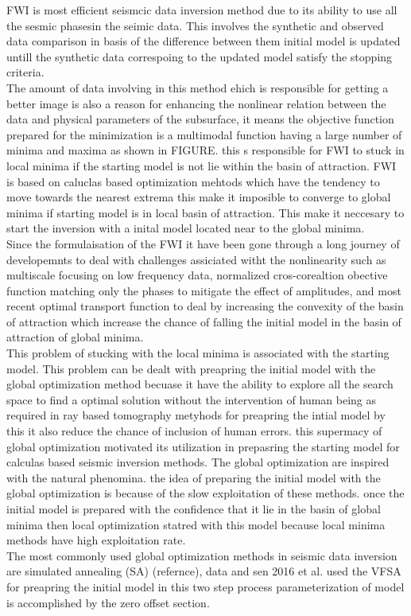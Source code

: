 \documentclass[paper,revised]{geophysics}
\begin{document}
FWI is most efficient seismcic data inversion method due to its ability to use all the sesmic phasesin the seimic data. This involves the synthetic and observed data comparison in basis of the difference between them initial model is updated untill the synthetic data correspoing to the updated model satisfy the stopping criteria. 
\\
The amount of data involving in this method ehich is responsible for getting a better image is also a reason for enhancing the nonlinear relation between the data and physical parameters of the subsurface, it means the objective function prepared for the minimization is a multimodal function having a large number of minima and maxima as shown in FIGURE. this s responsible for FWI to stuck in local minima if the starting model is not lie within the basin of attraction. FWI is based on caluclas based optimization mehtods which have the tendency to move towards the nearest extrema this make it imposible to converge to global minima if starting model is in local basin of attraction. This make it neccesary to start the inversion with a inital model located near to the global minima.
\\
Since the formulaisation of the FWI it have been gone through a long journey of developemnts to deal with challenges assiciated witht the nonlinearity such as multiscale focusing on low frequency data, normalized cros-corealtion obective function matching only the phases to mitigate the effect of amplitudes, and most recent optimal transport function to deal by increasing the convexity of the basin of attraction which increase the chance of falling the initial model in the basin of attraction of global minima. 
\\
This problem of stucking with the local minima is associated with the starting model. This problem can be dealt with preapring the initial model with the global optimization method becuase it have the ability to explore all the search space to find a optimal solution without the intervention of human being as required in ray based tomography metyhods for preapring the intial model by this it also reduce the chance of inclusion of human errors. this supermacy of global optimization motivated its utilization in prepasring the starting model for calculas based seismic inversion methods. The global optimization are inspired with the natural phenomina. the idea of preparing the initial model with the global optimization is because of the slow exploitation of these methods. once the initial model is prepared with the confidence that it lie in the basin of global minima then local optimization statred with this model because local minima methods have high exploitation rate.
\\
The most commonly used global optimization methods in seismic data inversion are simulated annealing (SA) (refernce), data and sen 2016 et al. used the VFSA for preapring the initial model in this two step process parameterization of model is accomplished by the zero offset section.
\end{document}
